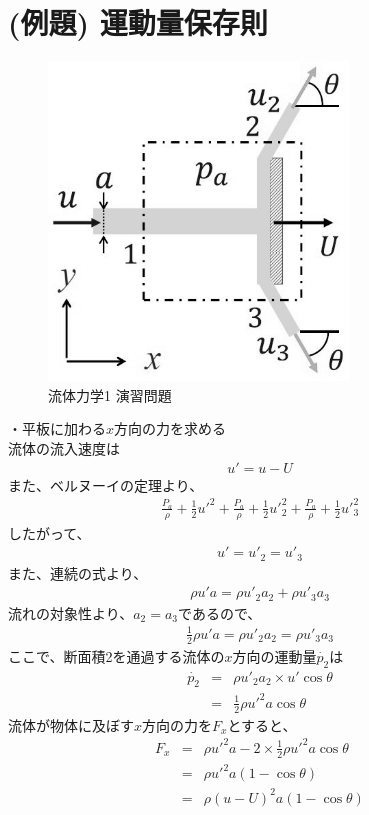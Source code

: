 \documentclass[a4paper]{jsarticle}
\begin{document}
\section{(例題) 運動量保存則}
\begin{figure}[htbp]
    \begin{center}
        \includegraphics[width=80mm]{images/ryuriki_image5.jpg}
        \caption{流体力学1 演習問題}
    \end{center}
\end{figure}
・平板に加わる$x$方向の力を求める\\
流体の流入速度は
\begin{eqnarray*}
    u'=u-U
\end{eqnarray*}
また、ベルヌーイの定理より、
\begin{eqnarray*}
    \frac{P_a}{\rho}+\frac{1}{2}{u'}^2+\frac{P_a}{\rho}+\frac{1}{2}{u'}_2^2+\frac{P_a}{\rho}+\frac{1}{2}{u'}_3^2
\end{eqnarray*}
したがって、
\begin{eqnarray*}
    u'={u'}_2={u'}_3
\end{eqnarray*}
また、連続の式より、
\begin{eqnarray*}
    \rho {u'} a= \rho {u'}_2 a_2 + \rho {u'}_3 a_3
\end{eqnarray*}
流れの対象性より、$a_2 = a_3$であるので、
\begin{eqnarray*}
    \frac{1}{2}\rho {u'} a = \rho {u'}_2 a_2 = \rho {u'}_3 a_3
\end{eqnarray*}
ここで、断面積2を通過する流体の$x$方向の運動量$\dot{p_2}$は
\begin{eqnarray*}
    \dot{p_2}&=&\rho {u'}_2 a_2 \times {u'}\cos\theta\\
    &=&\frac{1}{2} \rho {u'}^2 a\cos\theta
\end{eqnarray*}
流体が物体に及ぼす$x$方向の力を$F_x$とすると、
\begin{eqnarray*}
    F_x&=&\rho {u'}^2 a - 2 \times \frac{1}{2} \rho {u'}^2 a\cos\theta\\
    &=&\rho {u'}^2 a \left(1-\cos \theta\right)\\
    &=&\rho \left(u-U\right)^2 a \left(1-\cos \theta\right)\\
\end{eqnarray*}
\end{document}
